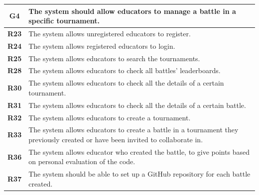 \documentclass[12pt, a4paper]{report}
\begin{document}
    \begin{table}[H]
        \begin{tabularx}{\textwidth}{cX}
        \textbf{G4} & The system should allow educators to manage a battle in a specific tournament.    \\
        \hline
        \textbf{R23} & The system allows unregistered educators to register. \\
        \textbf{R24} & The system allows registered educators to login. \\
        \textbf{R25} & The system allows educators to search the tournaments.\\
        \textbf{R28} & The system allows educators to check all battles’ leaderboards.\\
        \textbf{R30} & The system allows educators to check all the details of a certain tournament.\\
        \textbf{R31} & The system allows educators to check all the details of a certain battle.\\
        \textbf{R32} & The system allows educators to create a tournament.\\
        \textbf{R33} & The system allows educators to create a battle in a tournament they previously created or have been invited to collaborate in.\\
        \textbf{R36} & The system allows educator who created the battle, to give points based on personal evaluation of the code.\\
        \textbf{R37} & The system should be able to set up a GitHub repository for each battle created.\\
        \end{tabularx}
    \end{table}
\end{document}
